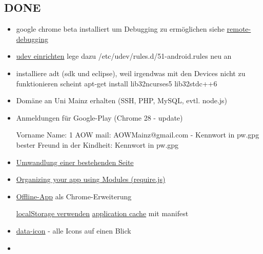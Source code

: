 \documentclass[a4paper]{scrartcl}
\begin{document}
		\subsection{DONE}
			\begin{itemize}
				\item google chrome beta installiert um Debugging zu ermöglichen siehe \href{https://developers.google.com/chrome-developer-tools/docs/remote-debugging}{remote-debugging}
				\item \href{http://developer.android.com/tools/device.html#setting-up}{udev einrichten} lege dazu /etc/udev/rules.d/51-android.rules neu an
				\item installiere adt (sdk und eclipse), weil irgendwas mit den Devices nicht zu funktionieren scheint \newline apt-get install lib32ncurses5 lib32stdc++6
				\item Domäne an Uni Mainz erhalten (SSH, PHP, MySQL, evtl. node.js)
				\item Anmeldungen für Google-Play (Chrome 28 - update)

					Vorname Name: 1 AOW \newline
					mail: AOWMainz@gmail.com - Kennwort in pw.gpg \newline
					bester Freund in der Kindheit: Kennwort in pw.gpg
				\item \href{http://www.ofbrooklyn.com/2012/11/13/backbonification-migrating-javascript-to-backbone}{Umwandlung einer bestehenden Seite}
				\item \href{http://backbonetutorials.com/organizing-backbone-using-modules/}{Organizing your app using Modules (require.js)}
				\item \href{http://developer.chrome.com/apps/about_apps.html}{Offline-App} als Chrome-Erweiterung
					
					\href{http://docs.webplatform.org/wiki/tutorials/offline_storage}{localStorage verwenden}\newline
					\href{http://docs.webplatform.org/wiki/tutorials/appcache_beginner}{application cache} mit manifest
				\item \href{http://jquerymobile.com/demos/1.3.0-rc.1/docs/lists/lists-themes.html}{data-icon} - alle Icons auf einen Blick
				\item 
			\end{itemize}
\end{document}
